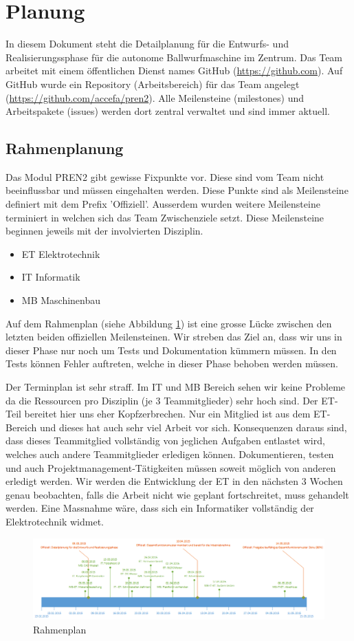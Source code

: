 \section{Planung}
In diesem Dokument steht die Detailplanung für die Entwurfs- und
Realisierungssphase für die autonome Ballwurfmaschine im Zentrum.
Das Team arbeitet mit einem öffentlichen Dienst names GitHub (\href{https://github.com}{https://github.com}).
Auf GitHub wurde ein Repository (Arbeitsbereich) für das Team angelegt
(\href{https://github.com/accefa/pren2}{https://github.com/accefa/pren2}). Alle Meilensteine (milestones) und Arbeitspakete (issues) werden dort zentral verwaltet und sind immer aktuell.

\subsection{Rahmenplanung}
Das Modul PREN2 gibt gewisse Fixpunkte vor. Diese sind vom Team nicht
beeinflussbar und müssen eingehalten werden. Diese Punkte sind als
Meilensteine definiert mit dem Prefix 'Offiziell'. Ausserdem wurden weitere
Meilensteine terminiert in welchen sich das Team Zwischenziele setzt. Diese Meilensteine beginnen jeweils mit der involvierten Disziplin.

\begin{itemize}
	\item ET Elektrotechnik
	\item IT Informatik
	\item MB Maschinenbau
\end{itemize}

Auf dem Rahmenplan (siehe Abbildung \ref{fig:rahmenplanung}) ist eine grosse Lücke zwischen den letzten beiden offiziellen Meilensteinen. Wir streben das Ziel an, dass wir uns in dieser Phase nur noch um Tests und Dokumentation kümmern müssen. In den Tests können Fehler auftreten, welche in dieser Phase behoben werden müssen.

Der Terminplan ist sehr straff. Im IT und MB Bereich sehen wir keine Probleme da die Ressourcen pro Disziplin (je 3 Teammitglieder) sehr hoch sind. Der ET-Teil bereitet hier uns eher Kopfzerbrechen. Nur ein Mitglied ist aus dem ET-Bereich und dieses hat auch sehr viel Arbeit vor sich. Konsequenzen
daraus sind, dass dieses Teammitglied vollständig von jeglichen Aufgaben
entlastet wird, welches auch andere Teammitglieder erledigen können.
Dokumentieren, testen und auch Projektmanagement-Tätigkeiten müssen soweit möglich von anderen erledigt werden. Wir werden die Entwicklung der ET in den nächsten 3 Wochen genau beobachten, falls die Arbeit nicht wie geplant fortschreitet, muss gehandelt werden. Eine Massnahme wäre, dass sich ein Informatiker vollständig der Elektrotechnik widmet.

\begin{landscape}
\begin{figure}
\centering
\includegraphics[width=1\linewidth]{../../fig/rahmenplanung}
\caption{Rahmenplan}
\label{fig:rahmenplanung}
\end{figure}
\end{landscape}
